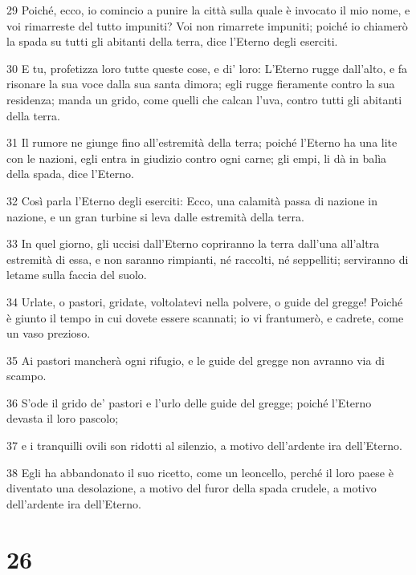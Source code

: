 \par 29 Poiché, ecco, io comincio a punire la città sulla quale è invocato il mio nome, e voi rimarreste del tutto impuniti? Voi non rimarrete impuniti; poiché io chiamerò la spada su tutti gli abitanti della terra, dice l'Eterno degli eserciti.
\par 30 E tu, profetizza loro tutte queste cose, e di' loro: L'Eterno rugge dall'alto, e fa risonare la sua voce dalla sua santa dimora; egli rugge fieramente contro la sua residenza; manda un grido, come quelli che calcan l'uva, contro tutti gli abitanti della terra.
\par 31 Il rumore ne giunge fino all'estremità della terra; poiché l'Eterno ha una lite con le nazioni, egli entra in giudizio contro ogni carne; gli empi, li dà in balìa della spada, dice l'Eterno.
\par 32 Così parla l'Eterno degli eserciti: Ecco, una calamità passa di nazione in nazione, e un gran turbine si leva dalle estremità della terra.
\par 33 In quel giorno, gli uccisi dall'Eterno copriranno la terra dall'una all'altra estremità di essa, e non saranno rimpianti, né raccolti, né seppelliti; serviranno di letame sulla faccia del suolo.
\par 34 Urlate, o pastori, gridate, voltolatevi nella polvere, o guide del gregge! Poiché è giunto il tempo in cui dovete essere scannati; io vi frantumerò, e cadrete, come un vaso prezioso.
\par 35 Ai pastori mancherà ogni rifugio, e le guide del gregge non avranno via di scampo.
\par 36 S'ode il grido de' pastori e l'urlo delle guide del gregge; poiché l'Eterno devasta il loro pascolo;
\par 37 e i tranquilli ovili son ridotti al silenzio, a motivo dell'ardente ira dell'Eterno.
\par 38 Egli ha abbandonato il suo ricetto, come un leoncello, perché il loro paese è diventato una desolazione, a motivo del furor della spada crudele, a motivo dell'ardente ira dell'Eterno.

\chapter{26}

